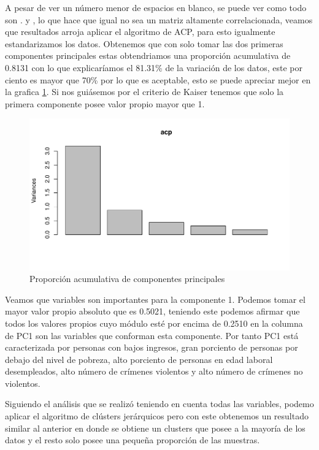 \documentclass[a4paper,10pt,twocolumn]{article}
\begin{document}
	A pesar de ver un número menor de espacios en blanco, se puede ver como todo son . y , lo que hace que igual no sea un matriz altamente correlacionada, veamos que resultados arroja aplicar el algoritmo de ACP, para esto igualmente estandarizamos los datos. Obtenemos que con solo tomar las dos primeras componentes principales estas obtendriamos una proporción acumulativa de 0.8131 con lo que explicaríamos el 81.31\% de la variación de los datos, este por ciento es mayor que 70\% por lo que es aceptable, esto se puede apreciar mejor en la grafica \ref{fig:acp_2}. Si nos guiásemos por el criterio de Kaiser tenemos que solo la primera componente posee valor propio mayor que 1.

	\begin{figure}[htb]
		\begin{center}
			\includegraphics[width=\columnwidth]{figures/acp_2.pdf}
		\end{center}
		\caption{Proporción acumulativa de componentes principales\label{fig:acp_2}}%
	\end{figure}

	Veamos que variables son importantes para la componente 1. Podemos tomar el mayor valor propio absoluto que es 0.5021, teniendo este podemos afirmar que todos los valores propios cuyo módulo esté por encima de 0.2510 en la columna de PC1 son las variables que conforman esta componente. Por tanto PC1 está caracterizada por personas con bajos ingresos, gran porciento de personas por debajo del nivel de pobreza, alto porciento de personas en edad laboral desempleados, alto número de crímenes violentos y alto número de crímenes no violentos.

	Siguiendo el análisis que se realizó teniendo en cuenta todas las variables, podemo aplicar el algoritmo de clústers jerárquicos pero con este obtenemos un resultado similar al anterior en donde se obtiene un clusters que posee a la mayoría de los datos y el resto solo posee una pequeña proporción de las muestras.
\end{document}
